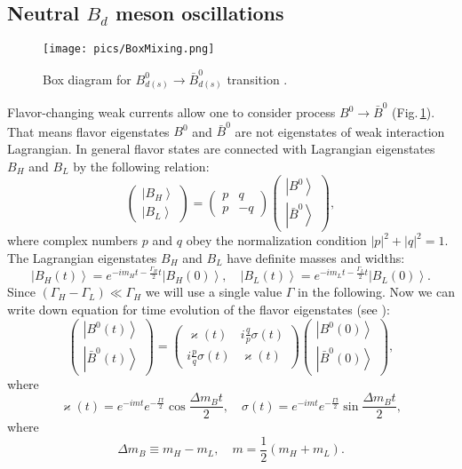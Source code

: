 \documentclass[preprint,aps,showpacs]{revtex4}
\newcommand{\kap}{\varkappa\left(t\right)}
\newcommand{\sig}{\sigma\left(t\right)}
\newcommand{\bz}{\left|B^0\right>}
\newcommand{\bzb}{\left|\bar B^0\right>}
\newcommand{\ba}{\left|B_H\right>}
\newcommand{\bb}{\left|B_L\right>}
\newcommand{\bzt}{\left|B^0\left(t\right)\right>}
\newcommand{\bzbt}{\left|\bar B^0\left(t\right)\right>}
\newcommand{\bat}{\left|B_H\left(t\right)\right>}
\newcommand{\bbt}{\left|B_L\left(t\right)\right>}
\newcommand{\bzti}{\left|B^0\left(0\right)\right>}
\newcommand{\bzbti}{\left|\bar B^0\left(0\right)\right>}
\newcommand{\bati}{\left|B_H\left(0\right)\right>}
\newcommand{\bbti}{\left|B_L\left(0\right)\right>}
\begin{document}
\subsection{Neutral $B_d$ meson oscillations}
\begin{figure}[htb]
\texttt{[image: pics/BoxMixing.png]}
\caption{Box diagram for $B^0_{d(s)}\to\bar B^0_{d(s)}$ transition \cite{BPhys}.}
\label{fig:BoxMixing}
\end{figure}
Flavor-changing weak currents allow one to consider process $B^0 \to \bar B^0$ (Fig.\,\ref{fig:BoxMixing}). That means flavor eigenstates $B^0$ and $\bar B^0$ are not eigenstates of weak interaction Lagrangian. In general flavor states are connected with Lagrangian eigenstates $B_H$ and $B_L$ by the following relation:
\begin{equation}\label{eq:basis_transformation}
 \left (\begin{array}{c}\ba\\ \bb\end{array}\right )=
\left (\begin{array}{cc}p & q\\
p & -q\end{array}\right )
\left (\begin{array}{c}\bz\\\bzb\end{array}\right ),
\end{equation}
where complex numbers $p$ and $q$ obey the normalization condition $\left|p\right|^2 +\left|q\right|^2 = 1$. The Lagrangian eigenstates $B_H$ and $B_L$ have definite masses and widths:
\begin{equation}
 \bat = e^{-im_Ht-\frac{\Gamma_H}{2}t}\bati,\quad \bbt = e^{-im_Lt-\frac{\Gamma_L}{2}t}\bbti.
\end{equation}
Since $\left(\Gamma_H-\Gamma_L\right)\ll \Gamma_H$ we will use a single value $\Gamma$ in the following. Now we can write down equation for time evolution of the flavor eigenstates (see \cite{CarterSanda,BigiSanda}):
 \begin{equation}\label{eq:flavor_states_evolution}
 \left (\begin{array}{c}\bzt\\\bzbt\end{array}\right )=
 \left (\begin{array}{cc}\kap & i\frac{q}{p}\sig\\
 i\frac{p}{q}\sig & \kap \end{array}\right )
 \left (\begin{array}{c}\bzti\\\bzbti\end{array}\right ),
 \end{equation}
where
 \begin{equation}
 \kap=e^{-imt}e^{-\frac{\Gamma t}{2}}\cos{\frac{\Delta m_B t}{2}},\quad
 \sig=e^{-imt}e^{-\frac{\Gamma t}{2}}\sin{\frac{\Delta m_B t}{2}},
 \end{equation}
 where
 \begin{equation}
  \Delta m_B \equiv m_H - m_L,\quad m = \frac{1}{2}(m_H+m_L).
 \end{equation}
 
\end{document}

